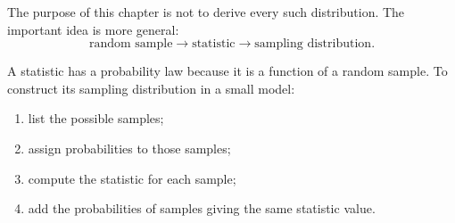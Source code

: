 The purpose of this chapter is not to derive every such distribution. The
important idea is more general:
\[
\text{random sample}
\longrightarrow
\text{statistic}
\longrightarrow
\text{sampling distribution}.
\]

\begin{summarybox}
A statistic has a probability law because it is a function of a random sample.
To construct its sampling distribution in a small model:
\begin{enumerate}
    \item list the possible samples;
    \item assign probabilities to those samples;
    \item compute the statistic for each sample;
    \item add the probabilities of samples giving the same statistic value.
\end{enumerate}
\end{summarybox}
